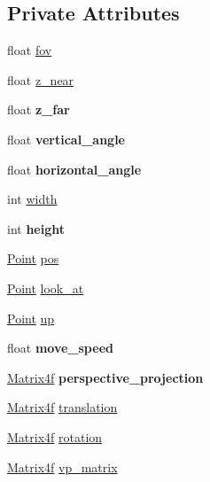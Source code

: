 \subsection*{Private Attributes}
\begin{DoxyCompactItemize}
\item 
float \mbox{\hyperlink{classagl_1_1Camera_a32e5a298b0def2beff1cb6d4dde901d8}{fov}}
\item 
float \mbox{\hyperlink{classagl_1_1Camera_a20ab35530883700a9e0d1d93157bcd66}{z\+\_\+near}}
\item 
\mbox{\label{classagl_1_1Camera_a8e817f178a0d69a4b32cce0fc6bb71b6}} 
float {\bfseries z\+\_\+far}
\item 
\mbox{\label{classagl_1_1Camera_a2a42ea9a6a6b5120f494db3f9a7e1e4b}} 
float {\bfseries vertical\+\_\+angle}
\item 
\mbox{\label{classagl_1_1Camera_a78e0bbb8e011124eb1276267d93eb354}} 
float {\bfseries horizontal\+\_\+angle}
\item 
int \mbox{\hyperlink{classagl_1_1Camera_ab7f25faffd597eb3557e9a41bed2a99f}{width}}
\item 
\mbox{\label{classagl_1_1Camera_a96462c427ddc903be6d0f24cb82a7738}} 
int {\bfseries height}
\item 
\mbox{\hyperlink{classagl_1_1Point}{Point}} \mbox{\hyperlink{classagl_1_1Camera_a4156ee2c5c0f0dc780d603245baaf081}{pos}}
\item 
\mbox{\hyperlink{classagl_1_1Point}{Point}} \mbox{\hyperlink{classagl_1_1Camera_ab18d396b235bab0688d935e73d921e5b}{look\+\_\+at}}
\item 
\mbox{\hyperlink{classagl_1_1Point}{Point}} \mbox{\hyperlink{classagl_1_1Camera_a654f2c23bdb8610c75a0fe8dcac82e99}{up}}
\item 
\mbox{\label{classagl_1_1Camera_a3882954ef41749684d3d16677761aa4b}} 
float {\bfseries move\+\_\+speed}
\item 
\mbox{\label{classagl_1_1Camera_a74f3790af58a5475ffb15429fdf46906}} 
\mbox{\hyperlink{classagl_1_1Matrix4f}{Matrix4f}} {\bfseries perspective\+\_\+projection}
\item 
\mbox{\hyperlink{classagl_1_1Matrix4f}{Matrix4f}} \mbox{\hyperlink{classagl_1_1Camera_a7f144f218001278cf7ef6e076b62c1dd}{translation}}
\item 
\mbox{\hyperlink{classagl_1_1Matrix4f}{Matrix4f}} \mbox{\hyperlink{classagl_1_1Camera_a89073494f44e962e4929d89c0e45fb1f}{rotation}}
\item 
\mbox{\hyperlink{classagl_1_1Matrix4f}{Matrix4f}} \mbox{\hyperlink{classagl_1_1Camera_afa314810b54bd4ba075471c20fe7514e}{vp\+\_\+matrix}}
\end{DoxyCompactItemize}


